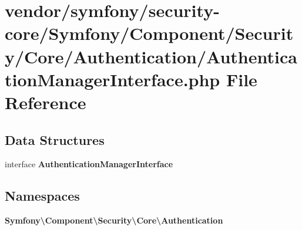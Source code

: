 \section{vendor/symfony/security-\/core/\+Symfony/\+Component/\+Security/\+Core/\+Authentication/\+Authentication\+Manager\+Interface.php File Reference}
\label{_authentication_manager_interface_8php}
\subsection*{Data Structures}
\begin{DoxyCompactItemize}
\item 
interface {\bf Authentication\+Manager\+Interface}
\end{DoxyCompactItemize}
\subsection*{Namespaces}
\begin{DoxyCompactItemize}
\item 
 {\bf Symfony\textbackslash{}\+Component\textbackslash{}\+Security\textbackslash{}\+Core\textbackslash{}\+Authentication}
\end{DoxyCompactItemize}

